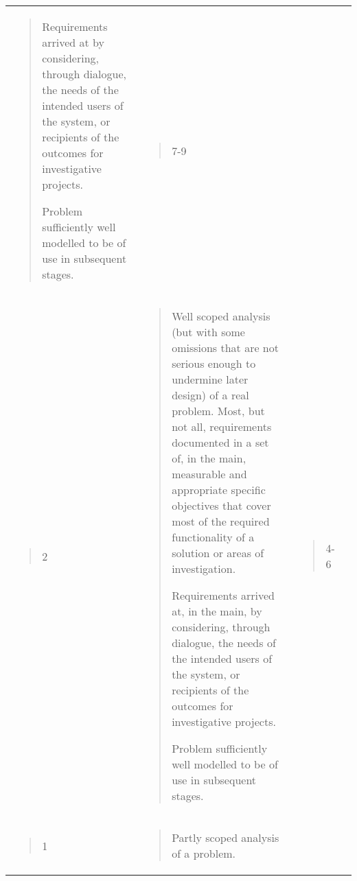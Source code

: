 \documentclass[
]{article}
\begin{document}
\begin{longtable}[]{@{}llll@{}}
\begin{minipage}[t]{0.22\columnwidth}
\begin{quote}
Requirements arrived at by considering, through dialogue, the needs of
the intended users of the system, or recipients of the outcomes for
investigative projects.

Problem sufficiently well modelled to be of use in subsequent stages.
\end{quote}\strut
\end{minipage} & \begin{minipage}[t]{0.22\columnwidth}\raggedright
\begin{quote}
7-9
\end{quote}\strut
\end{minipage} & \begin{minipage}[t]{0.22\columnwidth}\raggedright
\strut
\end{minipage}\tabularnewline
\begin{minipage}[t]{0.22\columnwidth}\raggedright
\begin{quote}
2
\end{quote}\strut
\end{minipage} & \begin{minipage}[t]{0.22\columnwidth}\raggedright
\begin{quote}
Well scoped analysis (but with some omissions that are not serious
enough to undermine later design) of a real problem. Most, but not all,
requirements documented in a set of, in the main, measurable and
appropriate specific objectives that cover most of the required
functionality of a solution or areas of investigation.

Requirements arrived at, in the main, by considering, through dialogue,
the needs of the intended users of the system, or recipients of the
outcomes for investigative projects.

Problem sufficiently well modelled to be of use in subsequent stages.
\end{quote}\strut
\end{minipage} & \begin{minipage}[t]{0.22\columnwidth}\raggedright
\begin{quote}
4-6
\end{quote}\strut
\end{minipage} & \begin{minipage}[t]{0.22\columnwidth}\raggedright
\strut
\end{minipage}\tabularnewline
\begin{minipage}[t]{0.22\columnwidth}\raggedright
\begin{quote}
1
\end{quote}\strut
\end{minipage} & \begin{minipage}[t]{0.22\columnwidth}\raggedright
\begin{quote}
Partly scoped analysis of a problem.


\end{quote}
\end{minipage}
\end{longtable}
\end{document}
